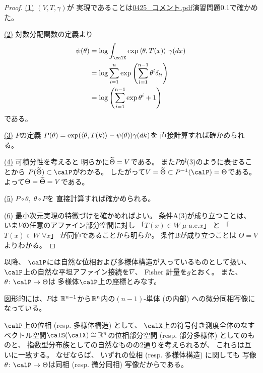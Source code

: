 \documentclass[report]{jlreq}
\begin{document}
\begin{proof}
    \uline{(1)} \quad
    $(V, T, \gamma)$が
    実現であることは\url{0425_コメント.pdf}演習問題0.1で確かめた。

    \uline{(2)} \quad
    対数分配関数の定義より
    \begin{alignat}{1}
        \psi(\theta)
            &=
                \log \int_\calX
                    \exp \myangle{\theta}{T(x)}
                    \, \gamma(dx)
                \\
            &=
                \log \sum_{i = 1}^n
                    \exp \myparen{
                        \sum_{l = 1}^{n - 1}
                            \theta^l
                            \delta_{li}
                    }
                \\
            &=
                \log \myparen{
                    \sum_{i = 1}^{n - 1}
                        \exp \theta^i
                    + 1
                }
    \end{alignat}
    である。

    \uline{(3)} \quad
    $P$の定義
    $P(\theta) = \exp(\left\langle{\theta},{T(k)}\right\rangle - \psi(\theta)) \gamma(dk)$を
    直接計算すれば確かめられる。

    \uline{(4)} \quad
    可積分性を考えると
    明らかに$\widetilde{\Theta} = V$である。
    また$P$が(3)のように表せることから
    $P(\wt{\Theta}) \subset \calP$がわかる。
    したがって$V = \wt{\Theta} \subset P^{-1}(\calP) = \Theta$である。
    よって$\Theta = \widetilde{\Theta} = V$である。

    \uline{(5)} \quad
    $P \circ \theta, \; \theta \circ P$を
    直接計算すれば確かめられる。

    \uline{(6)} \quad
    最小次元実現の特徴づけを確かめればよい。
    条件A(3)が成り立つことは、
    いま$V$の任意のアファイン部分空間に対し
    「$T(x) \in W \; \text{$\mu$-a.e.$x$}$」
    と
    「$T(x) \in W \; \text{$\forall x$}$」
    が同値であることから明らか。
    条件Bが成り立つことは
    $\Theta = V$よりわかる。
\end{proof}

以降、
$\calP$には自然な位相および多様体構造が入っているものとして扱い、
$\calP$上の自然な平坦アファイン接続を$\nabla$、
Fisher 計量を$g$とおく。
また、$\theta \colon \calP \to \Theta$は
多様体$\calP$上の座標とみなす。

図形的には、$P$は
$\mathbb{R}^{n - 1}$から$\mathbb{R}^n$内の$(n - 1)$-単体 (の内部) への微分同相写像になっている。

\begin{remark}
    $\calP$上の位相 (resp. 多様体構造) として、
    $\calX$上の符号付き測度全体のなす
    ベクトル空間$\calS(\calX) \cong \R^n$の位相部分空間 (resp. 部分多様体) としてのものと、
    指数型分布族としての自然なものの2通りを考えられるが、
    これらは互いに一致する。
    なぜならば、
    いずれの位相 (resp. 多様体構造) に関しても
    写像$\theta \colon \calP \to \Theta$は同相 (resp. 微分同相) 写像だからである。
\end{remark}
\end{document}

